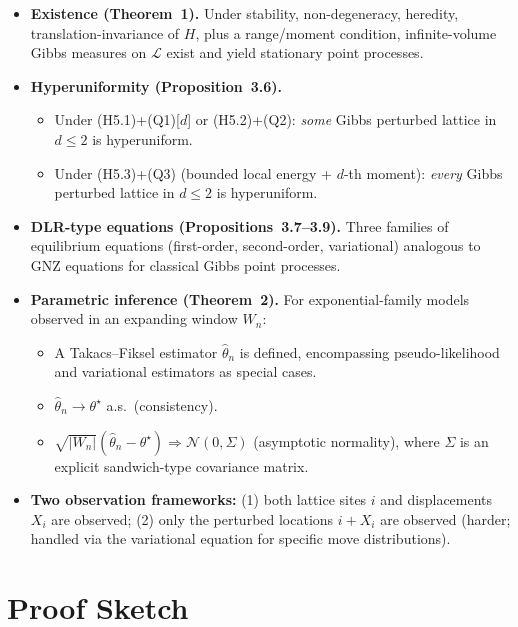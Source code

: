 \documentclass[11pt,a4paper]{article}
\begin{document}
\begin{itemize}
  \item \textbf{Existence (Theorem~1).}  Under stability, non-degeneracy, heredity, translation-invariance of $H$, plus a range/moment condition, infinite-volume Gibbs measures on $\mathcal{L}$ exist and yield stationary point processes.

  \item \textbf{Hyperuniformity (Proposition~3.6).}
    \begin{itemize}[nosep]
      \item[(i)] Under (H5.1)+(Q1)[$d$] or (H5.2)+(Q2): \emph{some} Gibbs perturbed lattice in $d\le 2$ is hyperuniform.
      \item[(ii)] Under (H5.3)+(Q3) (bounded local energy + $d$-th moment): \emph{every} Gibbs perturbed lattice in $d\le 2$ is hyperuniform.
    \end{itemize}

  \item \textbf{DLR-type equations (Propositions~3.7--3.9).}  Three families of equilibrium equations (first-order, second-order, variational) analogous to GNZ equations for classical Gibbs point processes.

  \item \textbf{Parametric inference (Theorem~2).}
    For exponential-family models observed in an expanding window $W_n$:
    \begin{itemize}[nosep]
      \item A Takacs--Fiksel estimator $\hat\theta_n$ is defined, encompassing pseudo-likelihood and variational estimators as special cases.
      \item $\hat\theta_n\to\theta^\star$ a.s.\ (consistency).
      \item $\sqrt{|W_n|}(\hat\theta_n-\theta^\star)\Rightarrow\mathcal{N}(0,\Sigma)$ (asymptotic normality), where $\Sigma$ is an explicit sandwich-type covariance matrix.
    \end{itemize}

  \item \textbf{Two observation frameworks:}
    (1) both lattice sites $i$ and displacements $X_i$ are observed;
    (2) only the perturbed locations $i+X_i$ are observed (harder; handled via the variational equation for specific move distributions).
\end{itemize}

\section{Proof Sketch}
\end{document}
